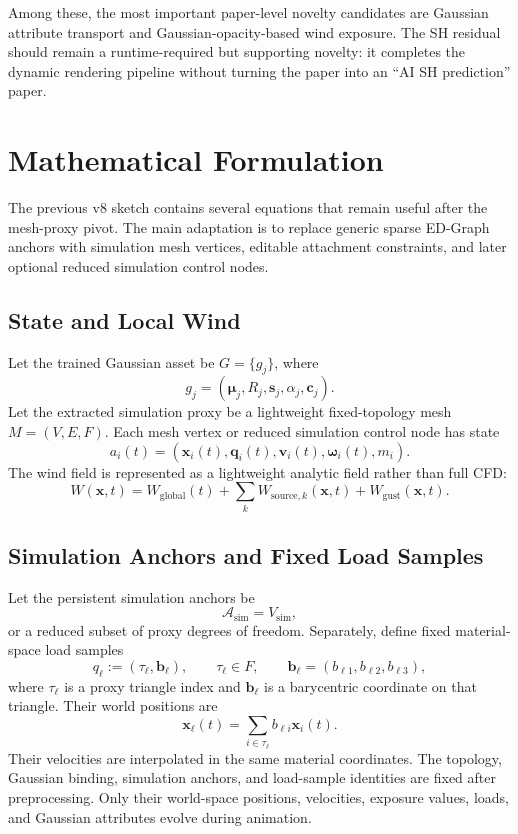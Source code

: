 \documentclass[11pt]{article}
\begin{document}
Among these, the most important paper-level novelty candidates are Gaussian attribute transport and Gaussian-opacity-based wind exposure. The SH residual should remain a runtime-required but supporting novelty: it completes the dynamic rendering pipeline without turning the paper into an ``AI SH prediction'' paper.

\section{Mathematical Formulation}

The previous v8 sketch contains several equations that remain useful after the mesh-proxy pivot. The main adaptation is to replace generic sparse ED-Graph anchors with simulation mesh vertices, editable attachment constraints, and later optional reduced simulation control nodes.

\subsection{State and Local Wind}

Let the trained Gaussian asset be \(G=\{g_j\}\), where
\[
  g_j = (\boldsymbol{\mu}_j, R_j, \mathbf{s}_j, \alpha_j, \mathbf{c}_j).
\]
Let the extracted simulation proxy be a lightweight fixed-topology mesh \(M=(V,E,F)\). Each mesh vertex or reduced simulation control node has state
\[
  a_i(t) = (\mathbf{x}_i(t), \mathbf{q}_i(t), \mathbf{v}_i(t), \boldsymbol{\omega}_i(t), m_i).
\]
The wind field is represented as a lightweight analytic field rather than full CFD:
\[
  W(\mathbf{x},t)
  =
  W_{\mathrm{global}}(t)
  + \sum_k W_{\mathrm{source},k}(\mathbf{x},t)
  + W_{\mathrm{gust}}(\mathbf{x},t).
\]

\subsection{Simulation Anchors and Fixed Load Samples}

Let the persistent simulation anchors be
\[
  \mathcal{A}_{\mathrm{sim}} = V_{\mathrm{sim}},
\]
or a reduced subset of proxy degrees of freedom. Separately, define fixed material-space load samples
\[
  q_\ell := (\tau_\ell,\mathbf{b}_\ell),
  \qquad
  \tau_\ell\in F,
  \qquad
  \mathbf{b}_\ell=(b_{\ell 1},b_{\ell 2},b_{\ell 3}),
\]
where \(\tau_\ell\) is a proxy triangle index and \(\mathbf{b}_\ell\) is a barycentric coordinate on that triangle. Their world positions are
\[
  \mathbf{x}_\ell(t)
  =
  \sum_{i\in \tau_\ell} b_{\ell i}\mathbf{x}_i(t).
\]
Their velocities are interpolated in the same material coordinates.
The topology, Gaussian binding, simulation anchors, and load-sample identities are fixed after preprocessing. Only their world-space positions, velocities, exposure values, loads, and Gaussian attributes evolve during animation.
\end{document}
